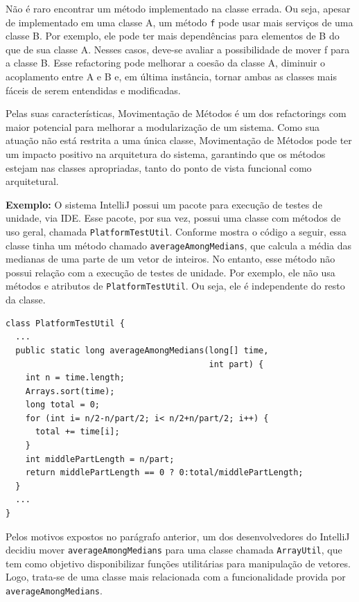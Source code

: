 \documentclass[
  11pt,
  twoside]{book}
\newcommand{\passthrough}[1]{#1}
\begin{document}

Não é raro encontrar um método implementado na classe errada. Ou seja,
apesar de implementado em uma classe A, um método
\passthrough{\lstinline!f!} pode usar mais serviços de uma classe B. Por
exemplo, ele pode ter mais dependências para elementos de B do que de
sua classe A. Nesses casos, deve-se avaliar a possibilidade de mover f
para a classe B. Esse refactoring pode melhorar a coesão da classe A,
diminuir o acoplamento entre A e B e, em última instância, tornar ambas
as classes mais fáceis de serem entendidas e modificadas.

Pelas suas características, Movimentação de Métodos é um dos
refactorings com maior potencial para melhorar a modularização de um
sistema. Como sua atuação não está restrita a uma única classe,
Movimentação de Métodos pode ter um impacto positivo na arquitetura do
sistema, garantindo que os métodos estejam nas classes apropriadas,
tanto do ponto de vista funcional como arquitetural.

\textbf{Exemplo:} O sistema IntelliJ possui um pacote para execução de
testes de unidade, via IDE. Esse pacote, por sua vez, possui uma classe
com métodos de uso geral, chamada
\passthrough{\lstinline!PlatformTestUtil!}. Conforme mostra o código a
seguir, essa classe tinha um método chamado
\passthrough{\lstinline!averageAmongMedians!}, que calcula a média das
medianas de uma parte de um vetor de inteiros. No entanto, esse método
não possui relação com a execução de testes de unidade. Por exemplo, ele
não usa métodos e atributos de
\passthrough{\lstinline!PlatformTestUtil!}. Ou seja, ele é independente
do resto da classe.

\begin{lstlisting}
class PlatformTestUtil {
  ...
  public static long averageAmongMedians(long[] time, 
                                         int part) {
    int n = time.length;
    Arrays.sort(time);
    long total = 0;
    for (int i= n/2-n/part/2; i< n/2+n/part/2; i++) {
      total += time[i];
    }
    int middlePartLength = n/part;
    return middlePartLength == 0 ? 0:total/middlePartLength;
  }
  ...
}
\end{lstlisting}

Pelos motivos expostos no parágrafo anterior, um dos desenvolvedores do
IntelliJ decidiu mover \passthrough{\lstinline!averageAmongMedians!}
para uma classe chamada \passthrough{\lstinline!ArrayUtil!}, que tem
como objetivo disponibilizar funções utilitárias para manipulação de
vetores. Logo, trata-se de uma classe mais relacionada com a
funcionalidade provida por
\passthrough{\lstinline!averageAmongMedians!}.
\end{document}
